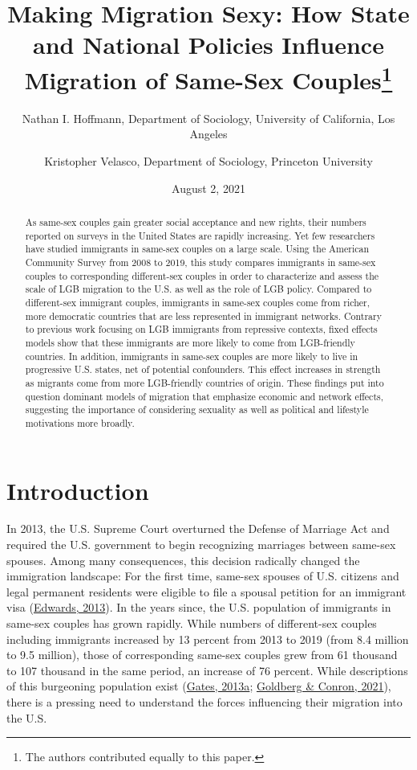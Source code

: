 \documentclass[
  11pt,
]{article}
\title{Making Migration Sexy: How State and National Policies Influence Migration of Same-Sex Couples\thanks{The authors contributed equally to this paper.}}
\author{Nathan I. Hoffmann, Department of Sociology, University of California, Los Angeles \and Kristopher Velasco, Department of Sociology, Princeton University}
\date{August 2, 2021}
\begin{document}
\maketitle
\begin{abstract}
As same-sex couples gain greater social acceptance and new rights, their numbers reported on surveys in the United States are rapidly increasing. Yet few researchers have studied immigrants in same-sex couples on a large scale. Using the American Community Survey from 2008 to 2019, this study compares immigrants in same-sex couples to corresponding different-sex couples in order to characterize and assess the scale of LGB migration to the U.S. as well as the role of LGB policy. Compared to different-sex immigrant couples, immigrants in same-sex couples come from richer, more democratic countries that are less represented in immigrant networks. Contrary to previous work focusing on LGB immigrants from repressive contexts, fixed effects models show that these immigrants are more likely to come from LGB-friendly countries. In addition, immigrants in same-sex couples are more likely to live in progressive U.S. states, net of potential confounders. This effect increases in strength as migrants come from more LGB-friendly countries of origin. These findings put into question dominant models of migration that emphasize economic and network effects, suggesting the importance of considering sexuality as well as political and lifestyle motivations more broadly.
\end{abstract}

\hypertarget{introduction}{%
\section{Introduction}\label{introduction}}

In 2013, the U.S. Supreme Court overturned the Defense of Marriage Act and required the U.S. government to begin recognizing marriages between same-sex spouses. Among many consequences, this decision radically changed the immigration landscape: For the first time, same-sex spouses of U.S. citizens and legal permanent residents were eligible to file a spousal petition for an immigrant visa (\protect\hyperlink{ref-edwards_2013}{Edwards, 2013}). In the years since, the U.S. population of immigrants in same-sex couples has grown rapidly. While numbers of different-sex couples including immigrants increased by 13 percent from 2013 to 2019 (from 8.4 million to 9.5 million), those of corresponding same-sex couples grew from 61 thousand to 107 thousand in the same period, an increase of 76 percent. While descriptions of this burgeoning population exist (\protect\hyperlink{ref-gates_2013}{Gates, 2013a}; \protect\hyperlink{ref-goldberg_2021}{Goldberg \& Conron, 2021}), there is a pressing need to understand the forces influencing their migration into the U.S.
\end{document}
